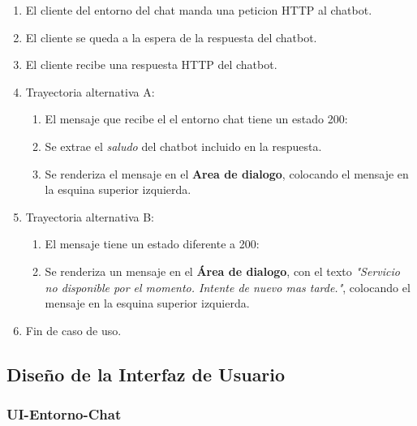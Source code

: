 \begin{enumerate}[leftmargin=2.5cm ,label={\bfseries CU-\arabic*}]
        \begin{enumerate}[label=\arabic*)]
            \item El cliente del entorno del chat manda una peticion HTTP al chatbot.
            \item El cliente se queda a la espera de la respuesta del chatbot.
            \item El cliente recibe una respuesta HTTP del chatbot.
            \item Trayectoria alternativa A:
                \begin{enumerate}[label=\arabic*)]
                    \item El mensaje que recibe el el entorno chat tiene un estado 200:
                    \item Se extrae el \textit{saludo} del chatbot incluido en la respuesta.
                    \item Se renderiza el mensaje en el \textbf{Area de dialogo}, colocando el mensaje en la esquina superior izquierda.
                \end{enumerate}

            \item Trayectoria alternativa B:
                \begin{enumerate}[label=\arabic*)]
                    \item El mensaje tiene un estado diferente a 200:
                    \item Se renderiza un mensaje en el \textbf{Área de dialogo}, con el texto \textit{"Servicio no disponible por el momento. Intente de nuevo mas tarde."}, colocando el mensaje en la esquina superior izquierda.
                \end{enumerate}
            \item Fin de caso de uso.
        \end{enumerate}
\end{enumerate}
\noindent\makebox[\linewidth]{\rule{\textwidth}{0.4pt}}

\newpage

\subsection{Diseño de la Interfaz de Usuario}

\subsubsection{UI-Entorno-Chat}
\label{subsubsec:ui-entorno-chat}

